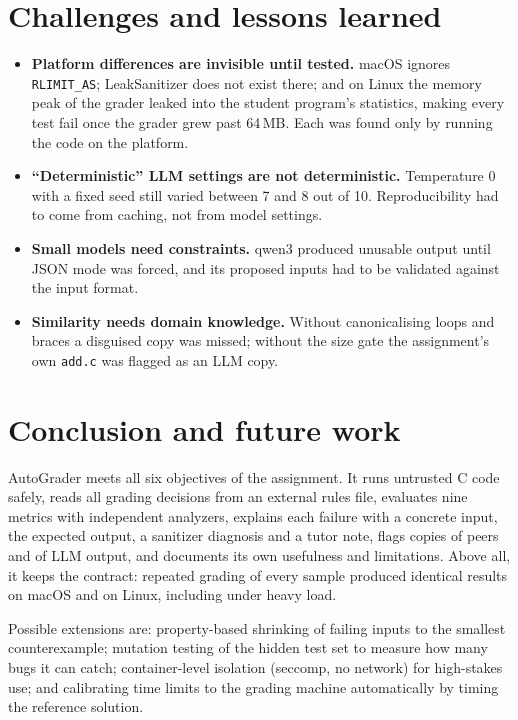 \documentclass[11pt,a4paper]{article}
\newcommand{\file}[1]{\nolinkurl{#1}}
\begin{document}
\section{Challenges and lessons learned}
\begin{itemize}
  \item \textbf{Platform differences are invisible until tested.} macOS ignores \texttt{RLIMIT\_AS}; LeakSanitizer does
        not exist there; and on Linux the memory peak of the grader leaked into the student program's statistics, making
        every test fail once the grader grew past 64\,MB. Each was found only by running the code on the platform.
  \item \textbf{``Deterministic'' LLM settings are not deterministic.} Temperature 0 with a fixed seed still varied
        between 7 and 8 out of 10. Reproducibility had to come from caching, not from model settings.
  \item \textbf{Small models need constraints.} qwen3 produced unusable output until JSON mode was forced, and its
        proposed inputs had to be validated against the input format.
  \item \textbf{Similarity needs domain knowledge.} Without canonicalising loops and braces a disguised copy was missed;
        without the size gate the assignment's own \file{add.c} was flagged as an LLM copy.
\end{itemize}

\section{Conclusion and future work}
AutoGrader meets all six objectives of the assignment. It runs untrusted C code safely, reads all grading decisions from
an external rules file, evaluates nine metrics with independent analyzers, explains each failure with a concrete input,
the expected output, a sanitizer diagnosis and a tutor note, flags copies of peers and of LLM output, and documents its
own usefulness and limitations. Above all, it keeps the contract: repeated grading of every sample produced identical
results on macOS and on Linux, including under heavy load.

Possible extensions are: property-based shrinking of failing inputs to the smallest counterexample; mutation testing of
the hidden test set to measure how many bugs it can catch; container-level isolation (seccomp, no network) for
high-stakes use; and calibrating time limits to the grading machine automatically by timing the reference solution.
\end{document}
